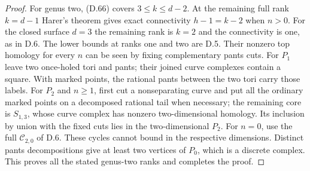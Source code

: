 \begin{proof}
For genus two, (D.66) covers $3\leq k\leq d-2$.
At the remaining full rank $k=d-1$ Harer's theorem
gives exact connectivity $h-1=k-2$ when $n>0$.
For the closed surface $d=3$ the remaining rank is
$k=2$ and the connectivity is one, as in D.6.
The lower bounds at ranks one and two are D.5.
Their nonzero top homology for every $n$ can be seen
by fixing complementary pants cuts.  For $P_1$ leave
two once-holed tori and pants; their joined curve
complexes contain a square.  With marked points,
the rational pants between the two tori carry those
labels.  For $P_2$ and $n\geq1$, first cut a
nonseparating curve and put all the ordinary marked
points on a decomposed rational tail when necessary;
the remaining core is $S_{1,3}$, whose curve complex
has nonzero two-dimensional homology.  Its inclusion
by union with the fixed cuts lies in the
two-dimensional $P_2$.  For $n=0$, use the full
$\mathcal C_{2,0}$ of D.6.  These cycles cannot bound
in the respective dimensions.  Distinct pants
decompositions give at least two vertices of $P_0$,
which is a discrete complex.  This proves all the
stated genus-two ranks and completes the proof.
\end{proof}
